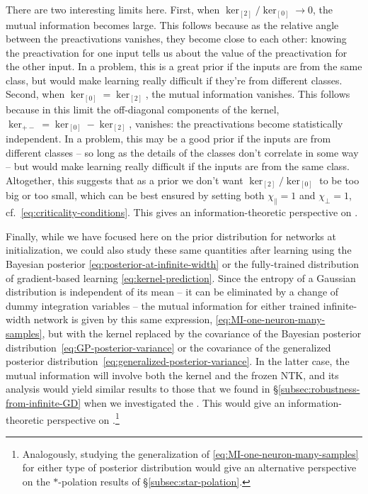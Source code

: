 There are two interesting limits here. First, when $\ker_{[2]}/\ker_{[0]}\rightarrow 0$, the mutual information becomes large.
This follows because as the relative angle between the preactivations vanishes, they become close to each other: knowing the preactivation for one input tells us about the value of the preactivation for  the other input.  In a  problem, this is a great prior if the inputs are from the same class, but would make learning really difficult if they're from different classes. Second, when $\ker_{[0]}=\ker_{[2]}$, the mutual information vanishes. This follows because in this limit the off-diagonal components of the kernel, $\ker_{+-}=\ker_{[0]}-\ker_{[2]}$, vanishes: the preactivations become statistically independent. In a  problem, this may be a good prior if the inputs are from different classes -- so long as the details of the classes don't correlate in some way -- but would make learning really difficult if the inputs are from the same class. Altogether, this suggests that as a prior we don't want $\ker_{[2]}/\ker_{[0]}$ to be too big or too small, which can be best ensured by setting both $\chi_\parallel =1$ and $\chi_\perp =1$, cf.~\eqref{eq:criticality-conditions}. This gives an information-theoretic perspective on .

Finally, while we have focused here on the prior distribution for  networks at initialization, we could also study these same quantities after learning using the Bayesian posterior \eqref{eq:posterior-at-infinite-width} or the fully-trained distribution of gradient-based learning \eqref{eq:kernel-prediction}.
Since the entropy of a Gaussian distribution is independent of its mean
 -- it can be eliminated by a change of dummy integration variables -- 
the mutual information  for either trained infinite-width network is given by this same expression, \eqref{eq:MI-one-neuron-many-samples}, but with the kernel replaced by the covariance of the Bayesian posterior distribution~\eqref{eq:GP-posterior-variance} or the covariance of the generalized posterior distribution~\eqref{eq:generalized-posterior-variance}. 
In the latter case, the mutual information will involve both the kernel and the frozen NTK, and its analysis would yield  similar results to those that we found in \S\ref{subsec:robustness-from-infinite-GD} when we investigated the . This would give an information-theoretic perspective on .\footnote{
    Analogously, studying the  generalization of \eqref{eq:MI-one-neuron-many-samples} for  either type of posterior distribution would give an alternative perspective on the $\ast$-polation results of \S\ref{subsec:star-polation}.
}  












